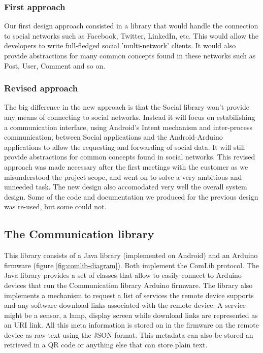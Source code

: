 \subsubsection{First approach}
Our first design approach consisted in a library that would handle the connection to social networks
such as Facebook, Twitter, LinkedIn, etc. This would  allow the developers to write full-fledged
social 'multi-network' clients. It would also provide abstractions for many common concepts
found in these networks such as Post, User, Comment and so on.

\subsubsection{Revised approach}
The big difference in the new approach is that the Social library won't provide any means
of connecting to social networks. Instead it will focus on estabilishing a communication interface,
using Android's Intent mechanism and inter-process communication, between Social applications and
the Android-Arduino applications to allow the requesting and forwarding of social data.
It will still provide abstractions for common concepts found in social networks.
This revised approach was made necessary after the first meetings with the customer as we misunderstood
the project scope, and went on to solve a very ambitious and unneeded task. The new design also accomodated
very well the overall system design. Some of the code and documentation we produced for the previous design
was re-used, but some could not.



\subsection{The Communication library}
This library consists of a Java library (implemented on Android) and an Arduino firmware (figure \ref{fig:comlib-diagram}). 
Both implement the ComLib protocol. The Java library provides a set of classes that allow to easily connect to Arduino 
devices that run the Communication library Arduino firmware. The library also implements a mechanism to request a list of 
services the remote device supports and any software download links associated with the remote device. A service might
be a sensor, a lamp, display screen while download links are represented as an URI link. All this meta information is stored
on in the firmware on the remote device as raw text using the JSON format. This metadata can also be stored an retrieved
in a QR code or anything else that can store plain text.


